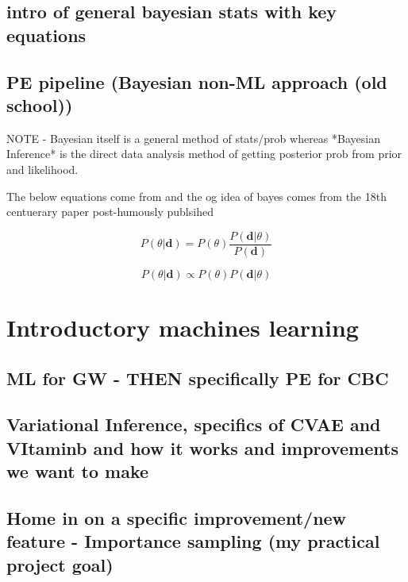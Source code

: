 \documentclass[11pt]{article}
\begin{document}
\subsection{intro of general bayesian stats with key equations}

\subsection{PE pipeline (Bayesian non-ML approach (old school))}
NOTE - Bayesian itself is a general method of stats/prob whereas *Bayesian Inference* is the direct data analysis method of getting posterior prob from prior and likelihood.

The below equations come from \cite{sivia2006textbook} and the og idea of bayes comes from the 18th centuerary paper post-humously publsihed \cite{bayesog}

\begin{equation}
\label{eq:bayes_equal}
P(\theta|\textbf{d}) = P(\theta ) \frac{P(\textbf{d} |\theta)}{P(\textbf{d})}
\end{equation}

\begin{equation}
\label{eq:bayes_propto}
P(\theta|\textbf{d}) \propto P(\theta ){P(\textbf{d} |\theta)}
\end{equation}

\section{Introductory machines learning}

\subsection{ML for GW - THEN specifically PE for CBC}



\subsection{Variational Inference, specifics of CVAE and VItaminb and how it works and improvements we want to make}

\subsection{Home in on a specific improvement/new feature - Importance sampling (my practical project goal)}
\end{document}

